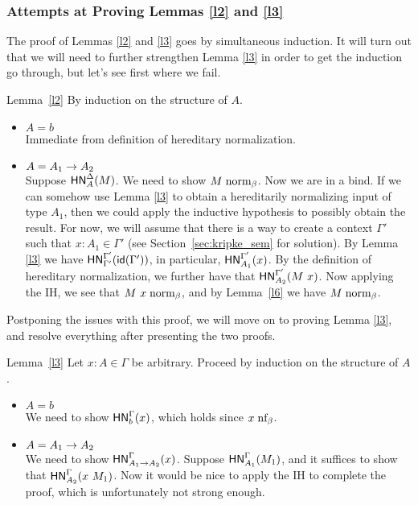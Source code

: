\documentclass{article}
\begin{document}
\subsubsection{Attempts at Proving Lemmas \ref{l2} and \ref{l3}}

The proof of Lemmas \ref{l2} and \ref{l3} goes by simultaneous induction.  It will turn out that
we will need to further strengthen Lemma \ref{l3} in order to get the induction go through, but
let's see first where we fail.

\begin{prfattemptref}{Lemma~\ref{l2}}
By induction on the structure of $A$.
\begin{itemize}
  \setlength\itemsep{1em}
  \item $A = b$\\
  Immediate from definition of hereditary normalization.
\item $A = A_1 \to A_2$\\
  Suppose $\mathsf{HN}^{\Delta}_{A}(M)$. We need to show $M \mathrel{\text{norm}_\beta}$. Now we are in a bind. If we can
  somehow use Lemma \ref{l3} to obtain a hereditarily normalizing input of type $A_1$, then we
  could apply the inductive hypothesis to possibly obtain the result. For now, we will
  assume that there is a way to create a context $\Gamma'$ such that $x : A_1 \in \Gamma'$ (see
  Section~\ref{sec:kripke_sem} for solution).  By Lemma \ref{l3} we have
  $\mathsf{HN}^{\Gamma'}_{\Gamma'}(\mathsf{id}(\Gamma'))$, in particular, $\mathsf{HN}^{\Gamma'}_{A_1}(x)$. By the
  definition of hereditary normalization, we further have that
  $\mathsf{HN}^{\Gamma'}_{A_2}(M\ x)$. Now applying the IH, we see that $M\ x \mathrel{\text{norm}_\beta}$, and
  by Lemma~\ref{l6} we have $M \mathrel{\text{norm}_\beta}$.  \qedhere
\end{itemize}
\end{prfattemptref}

Postponing the issues with this proof, we will move on to proving Lemma \ref{l3}, and resolve everything after
presenting the two proofs.

\begin{prfattemptref}{Lemma~\ref{l3}}
Let $x : A \in \Gamma$ be arbitrary. Proceed by induction on the structure of $A$.
\begin{itemize}
  \setlength\itemsep{1em}
  \item $A = b$\\
  We need to show $\mathsf{HN}^{\Gamma}_{b}(x)$, which holds since $x \mathrel{\text{nf}_\beta}$.
  \item $A = A_1 \to A_2$\\
  We need to show $\mathsf{HN}^{\Gamma}_{A_1 \to A_2}(x)$. Suppose $\mathsf{HN}^{\Gamma}_{A_1}(M_1)$, and it suffices to show
  that $\mathsf{HN}^{\Gamma}_{A_2}(x\ M_1)$. Now it would be nice to apply the IH to complete the proof, which
  is unfortunately not strong enough.
\end{itemize}
\end{prfattemptref}
\end{document}
